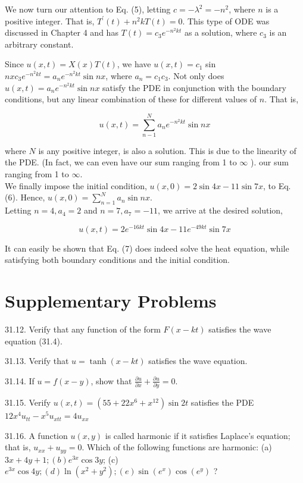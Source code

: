 \documentclass[10pt]{article}
\begin{document}
We now turn our attention to Eq. (5), letting $c=-\lambda^{2}=-n^{2}$, where $n$ is a positive integer. That is, $T^{\prime}(t)+n^{2} k T(t)=0$. This type of ODE was discussed in Chapter 4 and has $T(t)=c_{3} e^{-n^{2} k t}$ as a solution, where $c_{3}$ is an arbitrary constant.

Since $u(x, t)=X(x) T(t)$, we have $u(x, t)=c_{1}$ sin $n x c_{3} e^{-n^{2} k t}=a_{n} e^{-n^{2} k t} \sin n x$, where $a_{n}=c_{1} c_{3}$. Not only does $u(x, t)=a_{n} e^{-n^{2} k t} \sin n x$ satisfy the PDE in conjunction with the boundary conditions, but any linear combination of these for different values of $n$. That is,


\begin{equation*}
u(x, t)=\sum_{n-1}^{N} a_{n} e^{-n^{2} k t} \sin n x \tag{6}
\end{equation*}


where $N$ is any positive integer, is also a solution. This is due to the linearity of the PDE. (In fact, we can even have our sum ranging from 1 to $\infty$ ). our sum ranging from 1 to $\infty$.\\
We finally impose the initial condition, $u(x, 0)=2 \sin 4 x-11 \sin 7 x$, to Eq. (6). Hence, $u(x, 0)=\sum_{n=1}^{N} a_{n} \sin n x$.\\
Letting $n=4, a_{4}=2$ and $n=7, a_{7}=-11$, we arrive at the desired solution,


\begin{equation*}
u(x, t)=2 e^{-16 k t} \sin 4 x-11 e^{-49 k t} \sin 7 x \tag{7}
\end{equation*}


It can easily be shown that Eq. (7) does indeed solve the heat equation, while satisfying both boundary conditions and the initial condition.

\section*{Supplementary Problems}
31.12. Verify that any function of the form $F(x-k t)$ satisfies the wave equation (31.4).

31.13. Verify that $u=\tanh (x-k t)$ satisfies the wave equation.

31.14. If $u=f(x-y)$, show that $\frac{\partial u}{\partial x}+\frac{\partial u}{\partial y}=0$.

31.15. Verify $u(x, t)=\left(55+22 x^{6}+x^{12}\right) \sin 2 t$ satisfies the PDE $12 x^{4} u_{t t}-x^{5} u_{x t t}=4 u_{x x}$

31.16. A function $u(x, y)$ is called harmonic if it satisfies Laplace's equation; that is, $u_{x x}+u_{y y}=0$. Which of the following functions are harmonic: (a) $3 x+4 y+1 ;(b) e^{3 x} \cos 3 y$; (c) $e^{3 x} \cos 4 y ;(d) \ln \left(x^{2}+y^{2}\right) ;(e) \sin \left(e^{x}\right) \cos \left(e^{y}\right)$ ?
\end{document}
